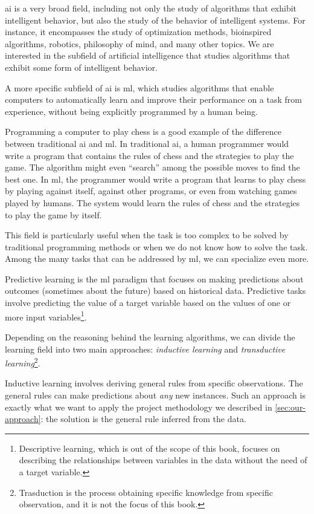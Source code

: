 \Gls{ai} is a very broad field, including not only the study of algorithms
that exhibit intelligent behavior, but also the study of the behavior of intelligent
systems.  For instance, it encompasses the study of optimization methods, bioinspired algorithms,
robotics, philosophy of mind, and many other topics.  We are interested in the subfield of
artificial intelligence that studies algorithms that exhibit some form of intelligent
behavior.

A more specific subfield of \gls{ai} is \gls{ml}, which studies algorithms that
enable computers to automatically learn and improve their performance on a task from
experience, without being explicitly programmed by a human being.

Programming a computer to play chess is a good example of the difference between
traditional \gls{ai} and \gls{ml}.  In traditional \gls{ai}, a human programmer
would write a program that contains the rules of chess and the strategies to play the game.
The algorithm might even ``search'' among the possible moves to find the best one.  In
\gls{ml}, the programmer would write a program that learns to play chess by playing
against itself, against other programs, or even from watching games played by humans.
The system would learn the rules of chess and the strategies to play the game by itself.

This field is particularly useful when the task is too complex to be solved by
traditional programming methods or when we do not know how to solve the task.
Among the many tasks that can be addressed by \gls{ml}, we can specialize even more.

Predictive learning is the \gls{ml} paradigm that focuses on making predictions about
outcomes (sometimes about the future) based on historical data.  Predictive tasks
involve predicting the value of a target variable based on the values of one or more
input variables\footnote{Descriptive learning, which is out of the scope of this book,
focuses on describing the relationships between variables in the data without the
need of a target variable.}.

Depending on the reasoning behind the learning algorithms, we can divide the learning
field into two main approaches: \emph{inductive learning} and \emph{transductive
learning}\footnote{Trasduction is the process obtaining specific knowledge from specific
observation, and it is not the focus of this book.}.

Inductive learning involves deriving general rules from specific observations.  The
general rules can make predictions about \emph{any} new instances.  Such an approach
is exactly what we want to apply the project methodology we described in
\cref{sec:our-approach}:  the solution is the general rule inferred from the data.

